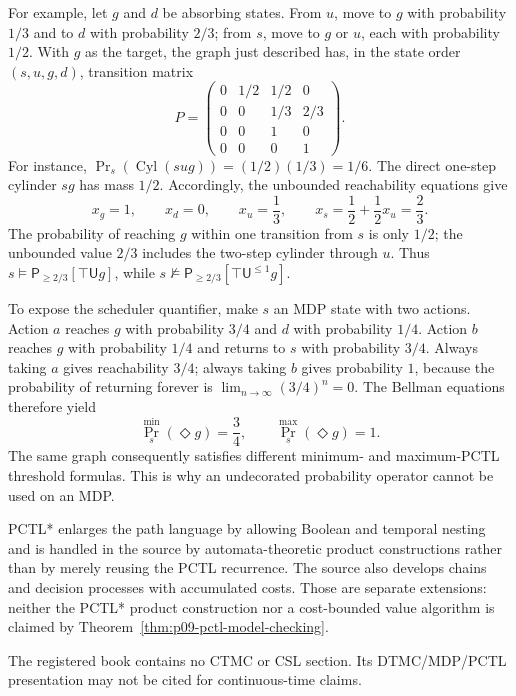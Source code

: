 For example, let \(g\) and \(d\) be absorbing states.  From \(u\), move to \(g\)
with probability \(1/3\) and to \(d\) with probability \(2/3\); from \(s\),
move to \(g\) or \(u\), each with probability \(1/2\).  With \(g\) as the target,
the graph just described has, in the state order \((s,u,g,d)\), transition
matrix
\[
 P=
 \begin{pmatrix}
  0&1/2&1/2&0\\
  0&0&1/3&2/3\\
  0&0&1&0\\
  0&0&0&1
 \end{pmatrix}.
\]
For instance,
\(\Pr_s(\operatorname{Cyl}(sug))=(1/2)(1/3)=1/6\).  The direct
one-step cylinder \(sg\) has mass \(1/2\).  Accordingly,
the unbounded reachability equations give
\[
 x_g=1,\qquad x_d=0,\qquad x_u=\frac13,\qquad
 x_s=\frac12+\frac12x_u=\frac23.
\]
The probability of reaching \(g\) within one transition from \(s\) is only
\(1/2\); the unbounded value \(2/3\) includes the two-step cylinder through
\(u\).  Thus \(s\models\mathsf P_{\geq2/3}[\top\mathsf U g]\), while
\(s\not\models\mathsf P_{\geq2/3}[\top\mathsf U^{\leq1}g]\).

To expose the scheduler quantifier, make \(s\) an MDP state with two actions.
Action \(a\) reaches \(g\) with probability \(3/4\) and \(d\) with probability
\(1/4\).  Action \(b\) reaches \(g\) with probability \(1/4\) and returns to
\(s\) with probability \(3/4\).  Always taking \(a\) gives reachability
\(3/4\); always taking \(b\) gives probability \(1\), because the probability
of returning forever is \(\lim_{n\to\infty}(3/4)^n=0\).  The Bellman equations
therefore yield
\[
 \Pr_s^{\min}(\Diamond g)=\frac34,
 \qquad
 \Pr_s^{\max}(\Diamond g)=1.
\]
The same graph consequently satisfies different minimum- and maximum-PCTL
threshold formulas.  This is why an undecorated probability operator cannot be
used on an MDP.

PCTL* enlarges the path language by allowing Boolean and temporal nesting and
is handled in the source by automata-theoretic product constructions rather
than by merely reusing the PCTL recurrence.  The source also develops chains
and decision processes with accumulated costs.  Those are separate extensions:
neither the PCTL* product construction nor a cost-bounded value algorithm is
claimed by Theorem~\ref{thm:p09-pctl-model-checking}.

The registered book contains no CTMC or CSL section.  Its DTMC/MDP/PCTL
presentation may not be cited for continuous-time claims.

